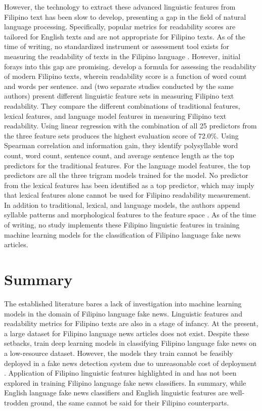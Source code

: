 However, the technology to extract these advanced linguistic features from Filipino text has been slow to develop, presenting a gap in the field of natural language processing. Specifically, popular metrics for readability scores are tailored for English texts and are not appropriate for Filipino texts. As of the time of writing, no standardized instrument or assessment tool exists for measuring the readability of texts in the Filipino language \cite{imperial-2020}. However, initial forays into this gap are promising.  develop a formula for assessing the readability of modern Filipino texts, wherein readability score is a function of word count and words per sentence.  and  (two separate studies conducted by the same authors) present different linguistic feature sets in measuring Filipino text readability. They compare the different combinations of traditional features, lexical features, and language model features in measuring Filipino text readability. Using linear regression with the combination of all 25 predictors from the three feature sets produces the highest evaluation score of 72.0\%. Using Spearman correlation and information gain, they identify polysyllable word count, word count, sentence count, and average sentence length as the top predictors for the traditional features. For the language model features, the top predictors are all the three trigram models trained for the model. No predictor from the lexical features has been identified as a top predictor, which may imply that lexical features alone cannot be used for Filipino readability measurement. In addition to traditional, lexical, and language models, the authors append syllable patterns and morphological features to the feature space \cite{imperial-2021, imperial-2020}. As of the time of writing, no study implements these Filipino linguistic features in training machine learning models for the classification of Filipino language fake news articles.

\section{Summary}

The established literature bares a lack of investigation into machine learning models in the domain of Filipino language fake news. Linguistic features and readability metrics for Filipino texts are also in a stage of infancy. At the present, a large dataset for Filipino language news articles does not exist. Despite these setbacks,  train deep learning models in classifying Filipino language fake news on a low-resource dataset. However, the models they train cannot be feasibly deployed in a fake news detection system due to unreasonable cost of deployment \cite{cruz2020localization, paleyes-2022}. Application of Filipino linguistic features highlighted in  and  has not been explored in training Filipino language fake news classifiers. In summary, while English language fake news classifiers and English linguistic features are well-trodden ground, the same cannot be said for their Filipino counterparts.